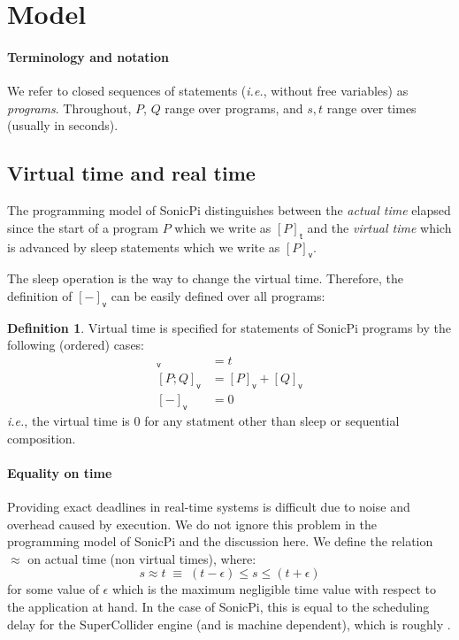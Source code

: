 \documentclass[preprint]{sigplanconf}
\renewcommand{\leq}{\leqslant}
\newcommand{\note}[1]{{\color{blue}{#1}}}
\theoremstyle{definition}
\newtheorem{definition}{Definition}
\newcommand{\sleep}{\mathsf{sleep}\;}
\newcommand{\sleepOp}{\textsf{sleep}}
\newcommand{\lang}{SonicPi}
\newcommand{\vtime}[1]{[#1]_{\mathsf{v}}}
\newcommand{\etime}[1]{[#1]_{\mathsf{t}}}
\newcommand{\ie}{\emph{i.e.}}
\begin{document}
\section{Model}

\paragraph{Terminology and notation}
We refer to closed sequences of statements (\ie{}, without free
variables) as \emph{programs}. Throughout, $P$, $Q$ range over programs,
and $s, t$ range over times (usually in seconds).

\subsection{Virtual time and real time}

The programming model of \lang{} distinguishes between the
\emph{actual time} elapsed since the start of a program $P$ which we
write as $\etime{P}$ and the \emph{virtual time} which is advanced by
\sleepOp{} statements which we write as $\vtime{P}$.

The \sleepOp{} operation is the way to change the virtual
time. Therefore, the definition of $\vtime{-}$ can be easily defined
over all programs:
%
\begin{definition}
Virtual time is specified for statements of \lang{} programs 
by the following (ordered) cases:
%
\begin{align*}
\vtime{\sleep t} & = t \\ 
\vtime{P; Q} & = \vtime{P} + \vtime{Q} \\
\vtime{-} & = 0
\end{align*}
%
\ie{}, the virtual time is $0$ 
for any statment other than \sleepOp{} or sequential composition.
\label{sleep-spec}
\end{definition}
\note{I haven't included here expressions, for example, if a call
to a function that did some sleeping happened, then this is not accounted
for here. I could be easily incldued though.}

\paragraph{Equality on time}

Providing exact deadlines in real-time systems is difficult due 
to noise and overhead caused by execution. We do not ignore
this problem in the programming model of \lang{} and the discussion here. 
We define the relation $\approx$ on actual time (non virtual times), where:
\begin{equation}
s \approx t
\;
\equiv
\;
(t - \epsilon) \leq s \leq (t + \epsilon)
\end{equation}
%
for some value of $\epsilon$ which is the maximum negligible 
time value with respect to the application at hand. In the case of
\lang{}, this is equal to the scheduling delay for the SuperCollider
engine (and is machine dependent), which is roughly \note{X}.
\end{document}
